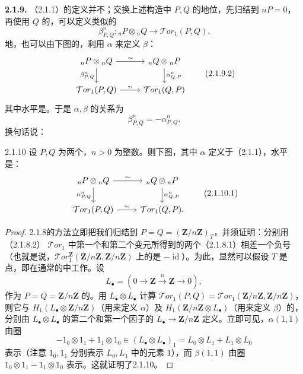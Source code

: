 \textbf{2.1.9.} （2.1.1）的定义并不；交换上述构造中 $P,Q$ 的地位，先归结到 $nP=0$，再使用 $Q$ 的，可以定义类似的
\[\beta^n_{P,Q}:{}_nP\otimes{}_nQ\longrightarrow\mathcal Tor_1(P,Q).\tag{2.1.9.1}\]
地，也可以由下图的，利用 $\alpha$ 来定义 $\beta$：
\[\begin{tikzcd}
{}_nP\otimes{}_nQ\arrow[r,"\sim"]\arrow[d,"{\beta^n_{P,Q}}"']&{}_nQ\otimes{}_nP\arrow[d,"{\alpha^n_{Q,P}}"]\\
\mathcal Tor_1(P,Q)\arrow[r,"\sim"]&\mathcal Tor_1(Q,P)
\end{tikzcd}\tag{2.1.9.2}\]
其中水平是。于是 $\alpha,\beta$ 的关系为
\[\beta^n_{P,Q}=-\alpha^n_{P,Q}.\tag{2.1.9.3}\]
换句话说：
\begin{SGAresult}{}{2.1.10}
设 $P,Q$ 为两个，$n>0$ 为整数。则下图，其中 $\alpha$ 定义于（2.1.1），水平是：
\[\begin{tikzcd}
{}_nP\otimes{}_nQ\arrow[r,"\sim"]\arrow[d,"{\alpha^n_{P,Q}}"']&{}_nQ\otimes{}_nP\arrow[d,"{\alpha^n_{Q,P}}"]\\
\mathcal Tor_1(P,Q)\arrow[r,"\sim"]&\mathcal Tor_1(Q,P).
\end{tikzcd}\tag{2.1.10.1}\]
\end{SGAresult}
\begin{proof}
2.1.8的方法立即把我们归结到 $P=Q=(\mathbf Z/n\mathbf Z)_T$，并须证明：分别用（2.1.8.2） $\mathcal Tor_1$ 中第一个和第二个变元所得到的两个（2.1.8.1）相差一个负号（也就是说，$\mathcal Tor_1^{\mathbf Z}(\mathbf Z/n\mathbf Z,\mathbf Z/n\mathbf Z)$ 上的是 $-\operatorname{id}$）。为此，显然可以假设 $T$ 是点，即在通常的中工作。设
\[L_\bullet=(0\longrightarrow\mathbf Z\xrightarrow{n}\mathbf Z\longrightarrow0),\]
作为 $P=Q=\mathbf Z/n\mathbf Z$ 的。用 $L_\bullet\otimes L_\bullet$ 计算 $\mathcal Tor_1(P,Q)=\mathcal Tor_1(\mathbf Z/n\mathbf Z,\mathbf Z/n\mathbf Z)$，则它与 $H_1(L_\bullet\otimes\mathbf Z/n\mathbf Z)$（用来定义 $\alpha$）及 $H_1(\mathbf Z/n\mathbf Z\otimes L_\bullet)$（用来定义 $\beta$）的，分别由 $L_\bullet\otimes L_\bullet$ 的第二个和第一个因子的 $L_\bullet\longrightarrow\mathbf Z/n\mathbf Z$ 定义。立即可见，$\alpha(1,1)$ 由圈
\[-1_0\otimes1_1+1_1\otimes1_0\in(L_\bullet\otimes L_\bullet)_1
=L_0\otimes L_1+L_1\otimes L_0\]
表示（注意 $1_0,1_1$ 分别表示 $L_0,L_1$ 中的元素 $1$），而 $\beta(1,1)$ 由圈 $1_0\otimes1_1-1_1\otimes1_0$ 表示。这就证明了2.1.10。
\end{proof}
